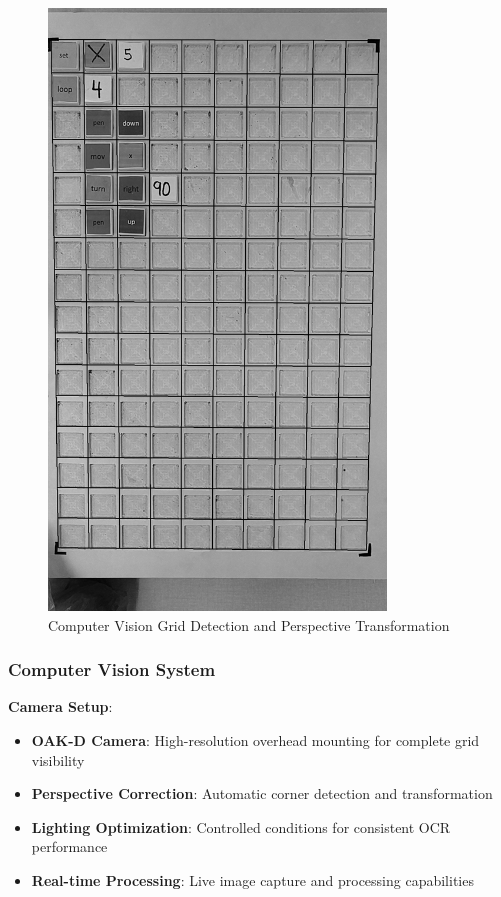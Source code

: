 \begin{figure}[H]
    \centering
    \includegraphics[width=0.8\textwidth]{assets/grid_overlay.jpg}
    \caption{Computer Vision Grid Detection and Perspective Transformation}
    \label{fig:grid_overlay}
\end{figure}

\subsubsection{Computer Vision System}
\textbf{Camera Setup}:
\begin{itemize}
    \item \textbf{OAK-D Camera}: High-resolution overhead mounting for complete grid visibility
    \item \textbf{Perspective Correction}: Automatic corner detection and transformation
    \item \textbf{Lighting Optimization}: Controlled conditions for consistent OCR performance
    \item \textbf{Real-time Processing}: Live image capture and processing capabilities
\end{itemize}

